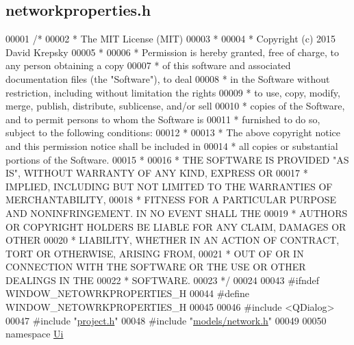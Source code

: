 \hypertarget{networkproperties_8h_source}{}\subsection{networkproperties.\+h}
\label{networkproperties_8h_source}

\begin{DoxyCode}
00001 \textcolor{comment}{/*}
00002 \textcolor{comment}{ * The MIT License (MIT)}
00003 \textcolor{comment}{ *}
00004 \textcolor{comment}{ * Copyright (c) 2015 David Krepsky}
00005 \textcolor{comment}{ *}
00006 \textcolor{comment}{ * Permission is hereby granted, free of charge, to any person obtaining a copy}
00007 \textcolor{comment}{ * of this software and associated documentation files (the "Software"), to deal}
00008 \textcolor{comment}{ * in the Software without restriction, including without limitation the rights}
00009 \textcolor{comment}{ * to use, copy, modify, merge, publish, distribute, sublicense, and/or sell}
00010 \textcolor{comment}{ * copies of the Software, and to permit persons to whom the Software is}
00011 \textcolor{comment}{ * furnished to do so, subject to the following conditions:}
00012 \textcolor{comment}{ *}
00013 \textcolor{comment}{ * The above copyright notice and this permission notice shall be included in}
00014 \textcolor{comment}{ * all copies or substantial portions of the Software.}
00015 \textcolor{comment}{ *}
00016 \textcolor{comment}{ * THE SOFTWARE IS PROVIDED "AS IS", WITHOUT WARRANTY OF ANY KIND, EXPRESS OR}
00017 \textcolor{comment}{ * IMPLIED, INCLUDING BUT NOT LIMITED TO THE WARRANTIES OF MERCHANTABILITY,}
00018 \textcolor{comment}{ * FITNESS FOR A PARTICULAR PURPOSE AND NONINFRINGEMENT. IN NO EVENT SHALL THE}
00019 \textcolor{comment}{ * AUTHORS OR COPYRIGHT HOLDERS BE LIABLE FOR ANY CLAIM, DAMAGES OR OTHER}
00020 \textcolor{comment}{ * LIABILITY, WHETHER IN AN ACTION OF CONTRACT, TORT OR OTHERWISE, ARISING FROM,}
00021 \textcolor{comment}{ * OUT OF OR IN CONNECTION WITH THE SOFTWARE OR THE USE OR OTHER DEALINGS IN THE}
00022 \textcolor{comment}{ * SOFTWARE.}
00023 \textcolor{comment}{ */}
00024 
00043 \textcolor{preprocessor}{#ifndef WINDOW\_NETOWRKPROPERTIES\_H}
00044 \textcolor{preprocessor}{#define WINDOW\_NETOWRKPROPERTIES\_H}
00045 
00046 \textcolor{preprocessor}{#include <QDialog>}
00047 \textcolor{preprocessor}{#include "\hyperlink{project_8h}{project.h}"}
00048 \textcolor{preprocessor}{#include "\hyperlink{network_8h}{models/network.h}"}
00049 
00050 \textcolor{keyword}{namespace }\hyperlink{namespace_ui}{Ui}

\end{DoxyCode}
